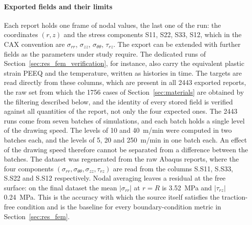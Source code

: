 \documentclass[subscriptcorrection,upint,varvw,barcolor=Goldenrod3,mathalfa=cal=euler,balance,hyphenate,french,pdf-a]{asmejour} %
\begin{document}
\paragraph{Exported fields and their limits}
Each report holds one frame of nodal values, the last one of the run: the coordinates $(r,z)$ and the stress components S11, S22, S33, S12, which in the CAX convention are $\sigma_{rr}$, $\sigma_{zz}$, $\sigma_{\theta\theta}$, $\tau_{rz}$. The export can be extended with further fields as the parameters under study require. The dedicated runs of Section~\ref{sec:res_fem_verification}, for instance, also carry the equivalent plastic strain PEEQ and the temperature, written as histories in time. %
The targets are read directly from these columns, which are present in all 2443 exported reports, the raw set from which the 1756 cases of Section~\ref{sec:materials} are obtained by the filtering described below, and the identity of every stored field is verified against all quantities of the report, not only the four expected ones. %
The 2443 runs come from seven batches of simulations, and each batch holds a single level of the drawing speed. The levels of 10 and 40~m/min were computed in two batches each, and the levels of 5, 20 and 250~m/min in one batch each. An effect of the drawing speed therefore cannot be separated from a difference between the batches. %
The dataset was regenerated from the raw Abaqus reports, where the four components $(\sigma_{rr}, \sigma_{\theta\theta}, \sigma_{zz}, \tau_{rz})$ are read from the columns S.S11, S.S33, S.S22 and S.S12 respectively. %
Nodal averaging leaves a residual at the free surface: on the final dataset the mean $|\sigma_{rr}|$ at $r=R$ is 3.52~MPa and $|\tau_{rz}|$ 0.24~MPa. %
This is the accuracy with which the source itself satisfies the traction-free condition and is the baseline for every boundary-condition metric in Section~\ref{sec:res_fem}. %
\end{document}
